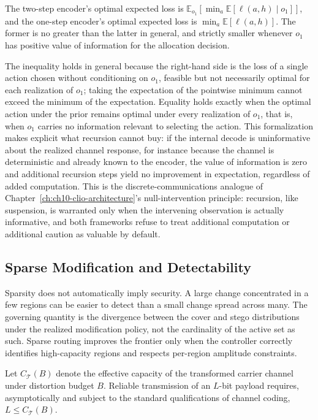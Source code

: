 \begin{proposition}
\label{prop:recursion}
The two-step encoder's optimal expected loss is $\mathbb{E}_{o_1}[\min_a \mathbb{E}[\ell(a,h) \mid o_1]]$, and the one-step encoder's optimal expected loss is $\min_a \mathbb{E}[\ell(a,h)]$. The former is no greater than the latter in general, and strictly smaller whenever $o_1$ has positive value of information for the allocation decision.
\end{proposition}

The inequality holds in general because the right-hand side is the loss of a single action chosen without conditioning on $o_1$, feasible but not necessarily optimal for each realization of $o_1$; taking the expectation of the pointwise minimum cannot exceed the minimum of the expectation. Equality holds exactly when the optimal action under the prior remains optimal under every realization of $o_1$, that is, when $o_1$ carries no information relevant to selecting the action. This formalization makes explicit what recursion cannot buy: if the internal decode is uninformative about the realized channel response, for instance because the channel is deterministic and already known to the encoder, the value of information is zero and additional recursion steps yield no improvement in expectation, regardless of added computation. This is the discrete-communications analogue of Chapter~\ref{ch:ch10-clio-architecture}'s null-intervention principle: recursion, like suspension, is warranted only when the intervening observation is actually informative, and both frameworks refuse to treat additional computation or additional caution as valuable by default.

\subsection{Sparse Modification and Detectability}

Sparsity does not automatically imply security. A large change concentrated in a few regions can be easier to detect than a small change spread across many. The governing quantity is the divergence between the cover and stego distributions under the realized modification policy, not the cardinality of the active set as such. Sparse routing improves the frontier only when the controller correctly identifies high-capacity regions and respects per-region amplitude constraints.

\begin{proposition}
\label{prop:capacity}
Let $C_\mathcal{T}(B)$ denote the effective capacity of the transformed carrier channel under distortion budget $B$. Reliable transmission of an $L$-bit payload requires, asymptotically and subject to the standard qualifications of channel coding, $L \leq C_\mathcal{T}(B)$.
\end{proposition}

